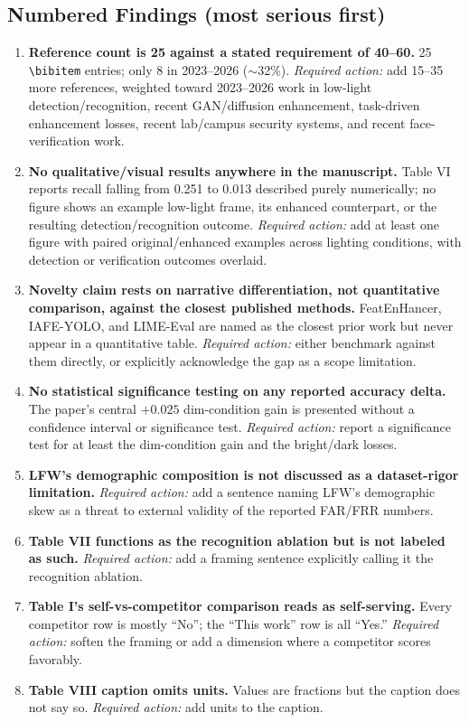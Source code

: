 \documentclass[conference]{IEEEtran}
\begin{document}
\subsection*{Numbered Findings (most serious first)}
\begin{enumerate}[leftmargin=*]
\item \textbf{Reference count is 25 against a stated requirement of
40--60.} 25 \texttt{\textbackslash bibitem} entries; only 8 in
2023--2026 ($\sim$32\%). \textit{Required action:} add 15--35 more
references, weighted toward 2023--2026 work in low-light
detection/recognition, recent GAN/diffusion enhancement,
task-driven enhancement losses, recent lab/campus security
systems, and recent face-verification work.

\item \textbf{No qualitative/visual results anywhere in the
manuscript.} Table VI reports recall falling from 0.251 to 0.013
described purely numerically; no figure shows an example
low-light frame, its enhanced counterpart, or the resulting
detection/recognition outcome. \textit{Required action:} add at
least one figure with paired original/enhanced examples across
lighting conditions, with detection or verification outcomes
overlaid.

\item \textbf{Novelty claim rests on narrative differentiation,
not quantitative comparison, against the closest published
methods.} FeatEnHancer, IAFE-YOLO, and LIME-Eval are named as the
closest prior work but never appear in a quantitative table.
\textit{Required action:} either benchmark against them directly,
or explicitly acknowledge the gap as a scope limitation.

\item \textbf{No statistical significance testing on any reported
accuracy delta.} The paper's central $+0.025$ dim-condition gain
is presented without a confidence interval or significance test.
\textit{Required action:} report a significance test for at least
the dim-condition gain and the bright/dark losses.

\item \textbf{LFW's demographic composition is not discussed as a
dataset-rigor limitation.} \textit{Required action:} add a
sentence naming LFW's demographic skew as a threat to external
validity of the reported FAR/FRR numbers.

\item \textbf{Table VII functions as the recognition ablation but
is not labeled as such.} \textit{Required action:} add a framing
sentence explicitly calling it the recognition ablation.

\item \textbf{Table I's self-vs-competitor comparison reads as
self-serving.} Every competitor row is mostly ``No''; the
``This work'' row is all ``Yes.'' \textit{Required action:} soften
the framing or add a dimension where a competitor scores
favorably.

\item \textbf{Table VIII caption omits units.} Values are
fractions but the caption does not say so. \textit{Required
action:} add units to the caption.
\end{enumerate}
\end{document}
